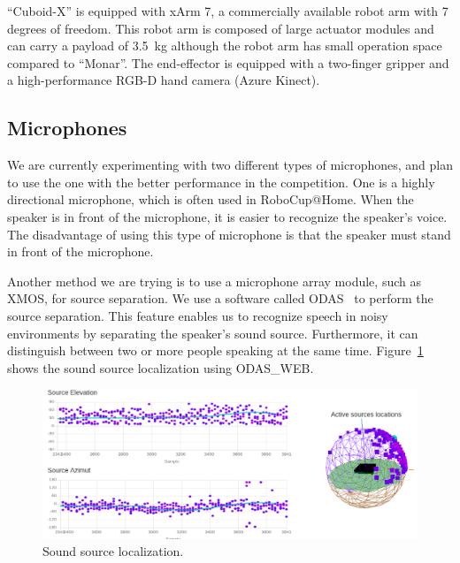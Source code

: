 \documentclass[runningheads,a4paper]{llncs}
\begin{document}
``Cuboid-X'' is equipped with xArm 7, a commercially available robot arm with 7 degrees of freedom. This robot arm is composed of large actuator modules and can carry a payload of 3.5~kg although the robot arm has small operation space compared to ``Monar''. The end-effector is equipped with a two-finger gripper and a high-performance RGB-D hand camera (Azure Kinect).


\subsection{Microphones}
We are currently experimenting with two different types of microphones, and plan to use the one with the better performance in the competition.
One is a highly directional microphone, which is often used in RoboCup@Home.
When the speaker is in front of the microphone, it is easier to recognize the speaker's voice. The disadvantage of using this type of microphone is that the speaker must stand in front of the microphone.

Another method we are trying is to use a microphone array module, such as XMOS, for source separation.
We use a software called ODAS~\cite{Grondin201963} to perform the source separation.
This feature enables us to recognize speech in noisy environments by separating the speaker's sound source. Furthermore, it can distinguish between two or more people speaking at the same time. Figure~\ref{fig:odas} shows the sound source localization using ODAS\_WEB.
\begin{figure}[tbp]
    \centering
    \includegraphics[width=0.6\linewidth]{images/odas_web_side.png}
    \caption{Sound source localization.}
    \label{fig:odas}
\end{figure}
\end{document}
